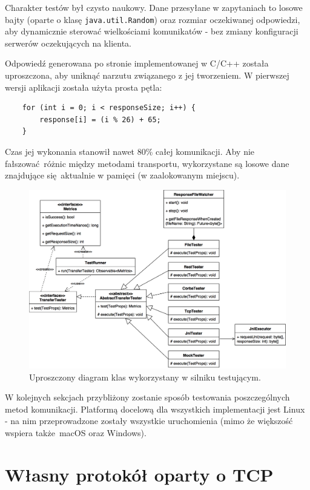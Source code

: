 \label{data_generation}
Charakter testów był czysto naukowy. Dane przesyłane w zapytaniach to losowe bajty (oparte o klasę \texttt{java.util.Random}) oraz rozmiar oczekiwanej odpowiedzi, aby dynamicznie sterować wielkościami komunikatów - bez zmiany konfiguracji serwerów oczekujących na klienta.

Odpowiedź generowana po stronie implementowanej w C/C++ została uproszczona, aby uniknąć narzutu związanego z jej tworzeniem. W pierwszej wersji aplikacji została użyta prosta pętla:

\begin{lstlisting}
    for (int i = 0; i < responseSize; i++) {
        response[i] = (i % 26) + 65;
    }
\end{lstlisting}

Czas jej wykonania stanowił nawet 80\% całej komunikacji. Aby nie fałszować różnic między metodami transportu, wykorzystane są losowe dane znajdujące się aktualnie w pamięci (w zaalokowanym miejscu).


\begin{figure}[H]
    \centering
    \includegraphics[width=\textwidth,height=\textheight,keepaspectratio]{img/class_diagram.png}
    \caption{Uproszczony diagram klas wykorzystany w silniku testującym.}
\end{figure}

W kolejnych sekcjach przybliżony zostanie sposób testowania poszczególnych metod komunikacji. Platformą docelową dla wszystkich implementacji jest Linux - na nim przeprowadzone zostały wszystkie uruchomienia (mimo że większość wspiera także macOS oraz Windows).

\section{Własny protokół oparty o TCP}

